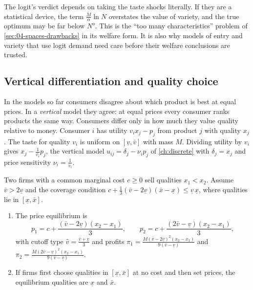 The logit's verdict depends on taking the taste shocks literally. If they are a statistical device, the term
$\frac{M}{\alpha}\ln N$ overstates the value of variety, and the true optimum may be far below $N^o$. This is the
``too many characteristics'' problem of \cref{sec:04-spaces-drawbacks} in its welfare form. It is also why models of
entry and variety that use logit demand need care before their welfare conclusions are trusted.

\subsection{Vertical differentiation and quality choice}\label{sec:04-vertical-quality}

In the models so far consumers disagree about which product is best at equal prices. In a \emph{vertical} model
they agree: at equal prices every consumer ranks products the same way. Consumers differ only in how much they value
quality relative to money. Consumer $i$ has utility $v_ix_j - p_j$ from product $j$ with quality $x_j$. The taste for
quality $v_i$ is uniform on $[\underline v, \bar v]$ with mass $M$. Dividing utility by $v_i$ gives
$x_j - \frac{1}{v_i}p_j$, the vertical model $u_{ij} = \delta_j - \nu_ip_j$ of \cref{ch:discrete} with
$\delta_j = x_j$ and price sensitivity $\nu_i = \frac{1}{v_i}$.

\begin{proposition}\label{prop:04-vertical}
Two firms with a common marginal cost $c \ge 0$ sell qualities $x_1 < x_2$. Assume $\bar v > 2\underline v$ and the
coverage condition $c + \frac{1}{3}(\bar v - 2\underline v)(\bar x - \underline x) \le \underline v\,\underline x$, where
qualities lie in $[\underline x, \bar x]$.
\begin{enumerate}[label=(\roman*)]
\item The price equilibrium is
\begin{equation}\label{eq:04-vertical-prices}
p_1 = c + \frac{(\bar v - 2\underline v)(x_2 - x_1)}{3}, \qquad p_2 = c + \frac{(2\bar v - \underline v)(x_2 - x_1)}{3},
\end{equation}
with cutoff type $\hat v = \frac{\bar v + \underline v}{3}$ and profits
$\pi_1 = \frac{M(\bar v - 2\underline v)^2(x_2 - x_1)}{9(\bar v - \underline v)}$ and
$\pi_2 = \frac{M(2\bar v - \underline v)^2(x_2 - x_1)}{9(\bar v - \underline v)}$.
\item If firms first choose qualities in $[\underline x, \bar x]$ at no cost and then set prices, the equilibrium
qualities are $\underline x$ and $\bar x$.
\end{enumerate}
\end{proposition}

